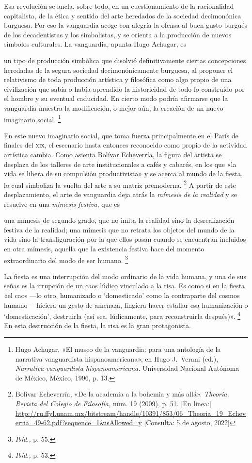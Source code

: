 \documentclass[14pt,twoside,final]{extbook} %
\let\oldfootnote\footnote
\renewcommand\footnote[1]{%
\oldfootnote{\hspace{1mm}#1}}
\begin{document}
Esa revolución se ancla, sobre todo, en un cuestionamiento de la racionalidad capitalista, de la ética y sentido del arte heredados de la sociedad decimonónica burguesa. Por eso la vanguardia acoge con alegría la ofensa al buen gusto burgués de los decadentistas y los simbolistas, y se orienta a la producción de nuevos símbolos culturales. La vanguardia, apunta Hugo Achugar, es
\begin{quoting}
un tipo de producción simbólica que disolvió definitivamente ciertas concepciones heredadas de la segura sociedad decimonónicamente burguesa, al proponer el relativismo de toda producción artística y
filosófica como algo propio de una civilización que sabía o había aprendido la historicidad de todo lo construido por el hombre y su eventual caducidad. En cierto modo podría afirmarse que la vanguardia muestra la modificación, o mejor aún, la creación de un nuevo imaginario social.\footnote{Hugo Achugar, «El museo de la vanguardia: para una antología de la narrativa vanguardista hispanoamericana», en Hugo J.~Verani (ed.), \emph{Narrativa vanguardista hispanoamericana.} Universidad Nacional Autónoma de México, México, 1996, p. 13.}
\end{quoting}
En este nuevo imaginario social, que toma fuerza principalmente en el París de finales del \textsc{xix}, el escenario hasta entonces reconocido como propio de la actividad artística cambia. Como asienta Bolívar Echeverría, la figura del artista se desplaza de los talleres de arte institucionales a cafés y cabarés, en los que «la vida se libera de su compulsión productivista» y se acerca al mundo de la fiesta, lo cual simboliza la vuelta del arte a su matriz premoderna.\footnote{Bolívar Echeverría, «De la academia a la bohemia y más allá». \emph{Theoría. Revista del Colegio de Filosofía,} núm. 19 (2009), p. 51. [En línea:] \url{http://ru.ffyl.unam.mx/bitstream/handle/10391/853/06_Theoria_19_Echeverria_49-62.pdf?sequence=1&isAllowed=y} [Consulta: 5 de agosto, 2022]} A partir de este desplazamiento, el arte de vanguardia deja atrás la \emph{mímesis de la realidad} y se resuelve en una \emph{mímesis festiva,} que es
\begin{quoting}
una mímesis de segundo grado, que no imita la realidad sino la desrealización festiva de la realidad; una mímesis que no retrata los objetos del mundo de la vida sino la transfiguración por la que ellos
pasan cuando se encuentran incluidos en otra mímesis, aquella que la existencia festiva hace del momento extraordinario del modo de ser humano.\footnote{\emph{Ibid.,} p. 55.}
\end{quoting}
La fiesta es una interrupción del modo ordinario de la vida humana, y una de sus señas es la irrupción de un caos lúdico vinculado a la risa. Es como si en la fiesta «el caos ---lo otro, humanizado o `domesticado' como la contraparte del cosmos humano--- hiciera un gesto de amenaza, fingiera hacer estallar esa humanización o `domesticación', destruirla (así sea, lúdicamente, para reconstruirla después)».\footnote{\emph{Ibid.,} p. 53.} En esta destrucción de la fiesta, la risa es la gran protagonista.
\end{document}
